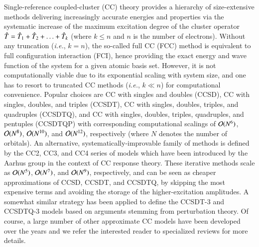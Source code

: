 \documentclass[aip,jcp,reprint,noshowkeys,superscriptaddress]{revtex4-1}
\newcommand{\ie}{\textit{i.e.}}
\newcommand{\hT}{\Hat{T}}
\begin{document}
Single-reference coupled-cluster (CC) theory provides a hierarchy of size-extensive methods delivering increasingly accurate energies and properties via the systematic increase of the maximum excitation degree of the cluster operator $\hT = \hT_1 + \hT_2 + \ldots + \hT_k$ (where $k \le n$ and $n$ is the number of electrons). \cite{Cizek_1966,Paldus_1972,Crawford_2000,Bartlett_2007,Shavitt_2009}
Without any truncation (\ie, $k = n$), the so-called full CC (FCC) method is equivalent to full configuration interaction (FCI), hence providing the exact energy and wave function of the system for a given atomic basis set.
However, it is not computationally viable due to its exponential scaling with system size, and one has to resort to truncated CC methods  (\ie, $k \ll n$) for computational convenience.
Popular choices are CC with singles and doubles (CCSD), \cite{Cizek_1966,Purvis_1982} CC with singles, doubles, and triples (CCSDT), \cite{Noga_1987a,Scuseria_1988} CC with singles, doubles, triples, and quadruples (CCSDTQ), \cite{Oliphant_1991,Kucharski_1992} and 
CC with singles, doubles, triples, quadruples, and pentuples (CCSDTQP) \cite{Hirata_2000,Kallay_2001} with corresponding computational scalings of $\order*{N^{6}}$, $\order*{N^{8}}$,  $\order*{N^{10}}$, and  $\order*{N^{12}}$, respectively (where $N$ denotes the number of orbitals).
An alternative, systematically-improvable family of methods is defined by the CC2, \cite{Christiansen_1995a} CC3, \cite{Christiansen_1995b,Koch_1997} and CC4 \cite{Kallay_2005} series of models which have been introduced by the Aarhus group in the context of CC response theory. \cite{Christiansen_1998}
These iterative methods scale as $\order*{N^{5}}$, $\order*{N^{7}}$, and $\order*{N^{9}}$, respectively, and can be seen as cheaper approximations of CCSD, CCSDT, and CCSDTQ, by skipping the most expensive terms and avoiding the storage of the higher-excitation amplitudes.
A somewhat similar strategy has been applied to define the CCSDT-3 \cite{Urban_1985,Noga_1987b} and CCSDTQ-3 \cite{Kallay_2005} models based on arguments stemming from perturbation theory.
Of course, a large number of other approximate CC models have been developed over the years and we refer the interested reader to specialized reviews for more details. \cite{Crawford_2000,Piecuch_2002,Bartlett_2007,Shavitt_2009}
\end{document}
